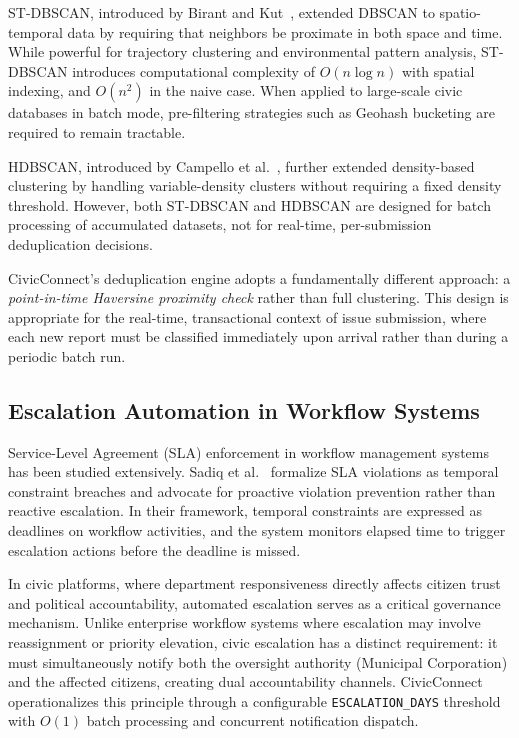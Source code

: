 \documentclass[conference]{IEEEtran}
\begin{document}
ST-DBSCAN, introduced by Birant and Kut~\cite{b6}, extended DBSCAN to spatio-temporal data by requiring that neighbors be proximate in both space and time. While powerful for trajectory clustering and environmental pattern analysis, ST-DBSCAN introduces computational complexity of $O(n \log n)$ with spatial indexing, and $O(n^2)$ in the naive case. When applied to large-scale civic databases in batch mode, pre-filtering strategies such as Geohash bucketing are required to remain tractable.

HDBSCAN, introduced by Campello et al.~\cite{b10}, further extended density-based clustering by handling variable-density clusters without requiring a fixed density threshold. However, both ST-DBSCAN and HDBSCAN are designed for batch processing of accumulated datasets, not for real-time, per-submission deduplication decisions.

CivicConnect's deduplication engine adopts a fundamentally different approach: a \textit{point-in-time Haversine proximity check} rather than full clustering. This design is appropriate for the real-time, transactional context of issue submission, where each new report must be classified immediately upon arrival rather than during a periodic batch run.

\subsection{Escalation Automation in Workflow Systems}

Service-Level Agreement (SLA) enforcement in workflow management systems has been studied extensively. Sadiq et al.~\cite{b7} formalize SLA violations as temporal constraint breaches and advocate for proactive violation prevention rather than reactive escalation. In their framework, temporal constraints are expressed as deadlines on workflow activities, and the system monitors elapsed time to trigger escalation actions before the deadline is missed.

In civic platforms, where department responsiveness directly affects citizen trust and political accountability, automated escalation serves as a critical governance mechanism. Unlike enterprise workflow systems where escalation may involve reassignment or priority elevation, civic escalation has a distinct requirement: it must simultaneously notify both the oversight authority (Municipal Corporation) and the affected citizens, creating dual accountability channels. CivicConnect operationalizes this principle through a configurable \texttt{ESCALATION\_DAYS} threshold with $O(1)$ batch processing and concurrent notification dispatch.
\end{document}
